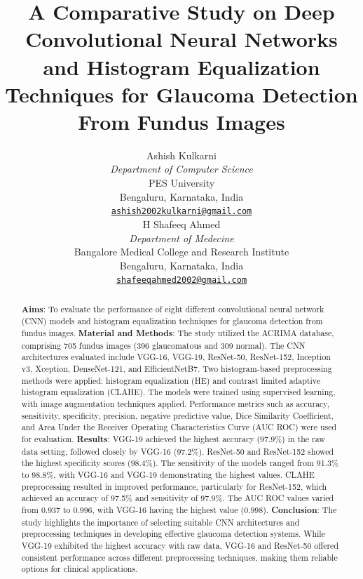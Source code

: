 \documentclass{article}
\title{A Comparative Study on Deep Convolutional Neural Networks and Histogram Equalization Techniques for Glaucoma Detection From Fundus Images}
\date{}
\author{ 
    Ashish Kulkarni\\
	\textit{Department of Computer Science}\\
    PES University\\
	Bengaluru, Karnataka, India\\
	\texttt{\href{mailto:ashish2002kulkarni@gmail.com}{ashish2002kulkarni@gmail.com}} \\
	\And
	H Shafeeq Ahmed \\
	\textit{Department of Medecine}\\
	Bangalore Medical College and Research Institute\\
    Bengaluru, Karnataka, India\\
	\texttt{\href{mailto:shafeeqahmed2002@gmail.com}{shafeeqahmed2002@gmail.com}} \\
}
\begin{document}
\maketitle

\begin{abstract}

\textbf{Aims}:
To evaluate the performance of eight different convolutional neural network (CNN) models and histogram equalization techniques for glaucoma detection from fundus images.
\textbf{Material and Methods}:
The study utilized the ACRIMA database, comprising 705 fundus images (396 glaucomatous and 309 normal). The CNN architectures evaluated include VGG-16, VGG-19, ResNet-50, ResNet-152, Inception v3, Xception, DenseNet-121, and EfficientNetB7. Two histogram-based preprocessing methods were applied: histogram equalization (HE) and contrast limited adaptive histogram equalization (CLAHE). The models were trained using supervised learning, with image augmentation techniques applied. Performance metrics such as accuracy, sensitivity, specificity, precision, negative predictive value, Dice Similarity Coefficient, and Area Under the Receiver Operating Characteristics Curve (AUC ROC) were used for evaluation.
\textbf{Results}:
VGG-19 achieved the highest accuracy (97.9\%) in the raw data setting, followed closely by VGG-16 (97.2\%). ResNet-50 and ResNet-152 showed the highest specificity scores (98.4\%). The sensitivity of the models ranged from 91.3\% to 98.8\%, with VGG-16 and VGG-19 demonstrating the highest values. CLAHE preprocessing resulted in improved performance, particularly for ResNet-152, which achieved an accuracy of 97.5\% and sensitivity of 97.9\%. The AUC ROC values varied from 0.937 to 0.996, with VGG-16 having the highest value (0.998).
\textbf{Conclusion}:
The study highlights the importance of selecting suitable CNN architectures and preprocessing techniques in developing effective glaucoma detection systems. While VGG-19 exhibited the highest accuracy with raw data, VGG-16 and ResNet-50 offered consistent performance across different preprocessing techniques, making them reliable options for clinical applications.
\end{abstract}


\end{document}
